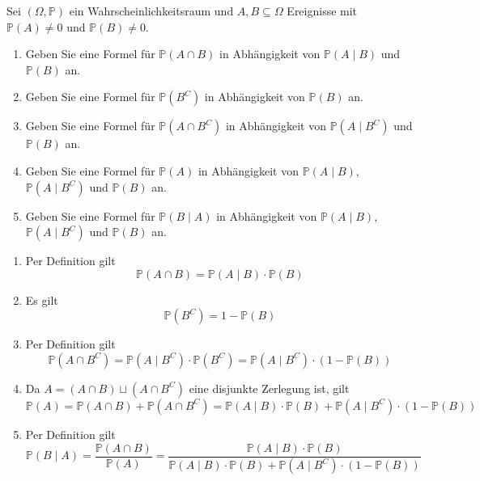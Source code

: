 \documentclass{article}
\begin{document}
\begin{problem}
Sei $(\Omega, \mathbb{P})$ ein Wahrscheinlichkeitsraum und $A, B \subseteq \Omega$ Ereignisse mit $\mathbb{P}(A) \neq 0$ und $\mathbb{P}(B) \neq 0$.
\begin{enumerate}
\item {
Geben Sie eine Formel für $\mathbb{P}(A \cap B)$ in Abhängigkeit von $\mathbb{P}(A \mid B)$ und $\mathbb{P}(B)$ an.
}
\item {
Geben Sie eine Formel für $\mathbb{P}(B^C)$ in Abhängigkeit von $\mathbb{P}(B)$ an.
}
\item {
Geben Sie eine Formel für $\mathbb{P}(A \cap B^C)$ in Abhängigkeit von $\mathbb{P}(A \mid B^C)$ und $\mathbb{P}(B)$ an.
}
\item {
Geben Sie eine Formel für $\mathbb{P}(A)$ in Abhängigkeit von $\mathbb{P}(A \mid B)$, $\mathbb{P}(A \mid B^C)$ und $\mathbb{P}(B)$ an.
}
\item {
Geben Sie eine Formel für $\mathbb{P}(B \mid A)$ in Abhängigkeit von $\mathbb{P}(A \mid B)$, $\mathbb{P}(A \mid B^C)$ und $\mathbb{P}(B)$ an.
}
\end{enumerate}
\end{problem}

\begin{solution}
\begin{enumerate}
\item {
Per Definition gilt
\[
\mathbb{P}(A \cap B) = \mathbb{P}(A \mid B) \cdot \mathbb{P}(B)
\]
}
\item {
Es gilt
\[
\mathbb{P}(B^C) = 1 - \mathbb{P}(B)
\]
}
\item {
Per Definition gilt
\[
\mathbb{P}(A \cap B^C) = \mathbb{P}(A \mid B^C) \cdot \mathbb{P}(B^C) = \mathbb{P}(A \mid B^C) \cdot (1 - \mathbb{P}(B))
\]
}
\item {
Da $A = (A \cap B) \sqcup (A \cap B^C)$ eine disjunkte Zerlegung ist, gilt
\[
\mathbb{P}(A) = \mathbb{P}(A \cap B) + \mathbb{P}(A \cap B^C) = \mathbb{P}(A \mid B) \cdot \mathbb{P}(B) + \mathbb{P}(A \mid B^C) \cdot (1 - \mathbb{P}(B))
\]
}
\item {
Per Definition gilt
\[
\mathbb{P}(B \mid A) = \frac{\mathbb{P}(A \cap B)}{\mathbb{P}(A)} = \frac{\mathbb{P}(A \mid B) \cdot \mathbb{P}(B)}{\mathbb{P}(A \mid B) \cdot \mathbb{P}(B) + \mathbb{P}(A \mid B^C) \cdot (1 - \mathbb{P}(B))}
\]
}
\end{enumerate}
\end{solution}
\end{document}
